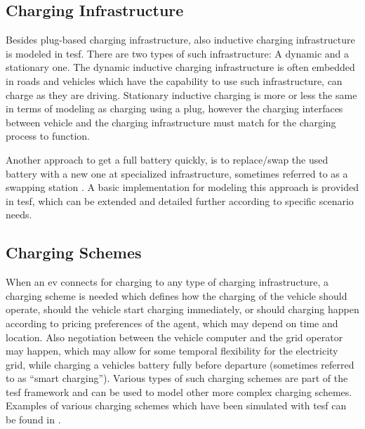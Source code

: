 \subsection{Charging Infrastructure}
Besides plug-based charging infrastructure, also inductive charging infrastructure is modeled in \gls{tesf}. There are two types of such infrastructure: A dynamic and a stationary one. The dynamic inductive charging infrastructure is often embedded in roads and vehicles which have the capability to use such infrastructure, can charge as they are driving. Stationary inductive charging is more or less the same in terms of modeling as charging using a plug, however the charging interfaces between vehicle and the charging infrastructure must match for the charging process to function.

Another approach to get a full battery quickly, is to replace/swap the used battery with a new one at specialized infrastructure, sometimes referred to as a swapping station \citep[][]{LiEtAl_ACC_2011}. A basic implementation for modeling this approach is provided in \gls{tesf}, which can be extended and detailed further according to specific scenario needs.

\subsection{Charging Schemes}
When an \gls{ev} connects for charging to any type of charging infrastructure, a charging scheme is needed which defines how the charging of the vehicle should operate, \eg should the vehicle start charging immediately, or should charging happen according to pricing preferences of the agent, which may depend on time and location. Also negotiation between the vehicle computer and the grid operator may happen, which may allow for some temporal flexibility for the electricity grid, while charging a vehicles battery fully before departure (sometimes referred to as ``smart charging''). Various types of such charging schemes are part of the \gls{tesf} framework and can be used to model other more complex charging schemes. Examples of various charging schemes which have been simulated with \gls{tesf} can be found in \citet[][]{WaraichEtAl_TRR_2013}.

